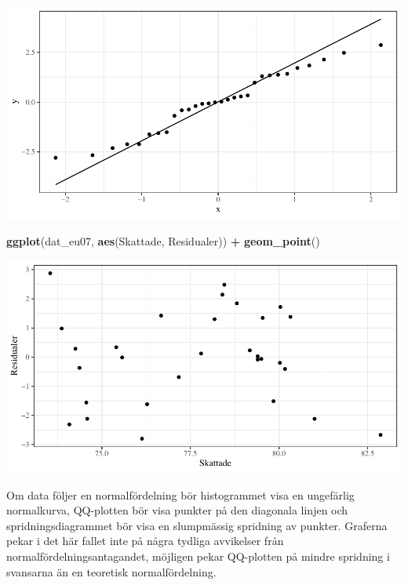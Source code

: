 \documentclass[
]{book}
\newenvironment{Shaded}{\begin{snugshade}}{\end{snugshade}}
\newcommand{\FunctionTok}[1]{\textcolor[rgb]{0.13,0.29,0.53}{\textbf{#1}}}
\newcommand{\NormalTok}[1]{#1}
\newcommand{\SpecialCharTok}[1]{\textcolor[rgb]{0.81,0.36,0.00}{\textbf{#1}}}
\theoremstyle{definition}
\theoremstyle{definition}
\theoremstyle{definition}
\theoremstyle{definition}
\theoremstyle{remark}
\begin{document}
\begin{center}\includegraphics{R-anvisningar_files/figure-latex/unnamed-chunk-270-1} \end{center}

\begin{Shaded}
\begin{Highlighting}[]
\FunctionTok{ggplot}\NormalTok{(dat\_eu07, }\FunctionTok{aes}\NormalTok{(Skattade, Residualer)) }\SpecialCharTok{+} \FunctionTok{geom\_point}\NormalTok{()}
\end{Highlighting}
\end{Shaded}

\begin{center}\includegraphics{R-anvisningar_files/figure-latex/unnamed-chunk-270-2} \end{center}

Om data följer en normalfördelning bör histogrammet visa en ungefärlig normalkurva, QQ-plotten bör visa punkter på den diagonala linjen och spridningsdiagrammet bör visa en slumpmässig spridning av punkter. Graferna pekar i det här fallet inte på några tydliga avvikelser från normalfördelningsantagandet, möjligen pekar QQ-plotten på mindre spridning i svansarna än en teoretisk normalfördelning.
\end{document}

